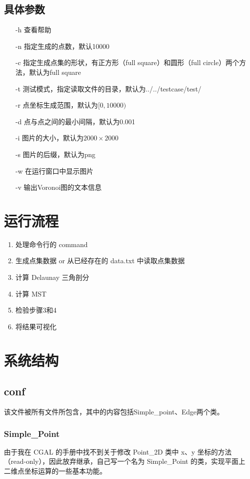 \documentclass[a4paper]{article}
\begin{document}
\subsection{具体参数}
\begin{itemize}
	\item [-h] 查看帮助
	\item [-n] 指定生成的点数，默认10000
	\item [-c] 指定生成点集的形状，有正方形（full square）和圆形（full circle）两个方法，默认为full square
	\item [-t] 测试模式，指定读取文件的目录，默认为../../testcase/test/
	\item [-r] 点坐标生成范围，默认为$[0,10000)$
	\item [-d] 点与点之间的最小间隔，默认为0.001
	\item [-i] 图片的大小，默认为$2000\times 2000$
	\item [-s] 图片的后缀，默认为png
	\item [-w] 在运行窗口中显示图片
	\item [-v] 输出Voronoi图的文本信息
\end{itemize}
\section{运行流程}
\begin{enumerate}
	\item 处理命令行的 command
	\item 生成点集数据 or 从已经存在的 data.txt 中读取点集数据
	\item 计算 Delaunay 三角剖分
	\item 计算 MST
	\item 检验步骤3和4 
	\item 将结果可视化 
\end{enumerate}
\section{系统结构}
\subsection{conf}
该文件被所有文件所包含，其中的内容包括Simple\_point、Edge两个类。

\subsubsection{Simple\_Point}

由于我在 CGAL 的手册中找不到关于修改 Point\_2D 类中 x、y 坐标的方法（read-only），因此放弃继承，自己写一个名为 Simple\_Point 的类，实现平面上二维点坐标运算的一些基本功能。
\end{document}

